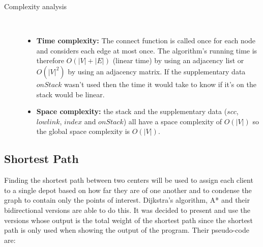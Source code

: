 \documentclass{article}
\begin{document}
\begin{description}
\item[Complexity analysis]\
\begin{itemize}
    \item \textbf{Time complexity:} The connect function is called once for each node and considers each edge at most once. The algorithm's running time is therefore $O(|V|+|E|)$ (linear time) by using an adjacency list or $O(|V|^2)$ by using an adjacency matrix. If the supplementary data $onStack$ wasn't used then the time it would take to know if it's on the stack would be linear. 
    \item \textbf{Space complexity:} the stack and the supplementary data ($scc$, $lowlink$, $index$ and $onStack$) all have a space complexity of $O(|V|)$ so the global space complexity is $O(|V|)$.
\end{itemize}
 
\end{description}
\newpage
\subsection{Shortest Path}
Finding the shortest path between two centers will be used to assign each client to a single depot based on how far they are of one another and to condense the graph to contain only the points of interest. Dijkstra's algorithm, A* and their bidirectional versions are able to do this. It was decided to present and use the versions whose output is the total weight of the shortest path since the shortest path is only used when showing the output of the program. Their pseudo-code are:
\end{document}

